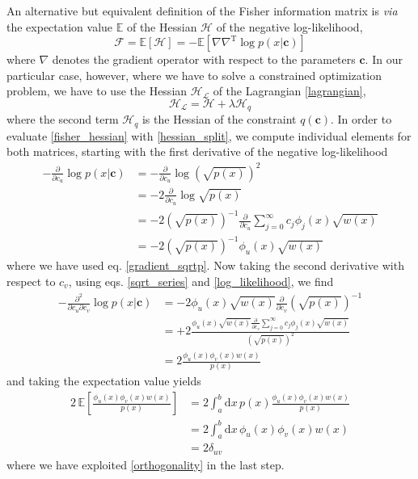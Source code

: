 \documentclass[]{report}
\begin{document}
		An alternative but equivalent definition of the Fisher information matrix is \textit{via} the expectation value $\mathbb{E}$ of the Hessian $\bm{\mathcal{H}}$ of the negative log-likelihood,
		\begin{equation}\label{fisher_hessian}
			\bm{\mathcal{F}} = \mathbb{E}\left[\bm{\mathcal{H}}\right] = -\mathbb{E}\left[\nabla\nabla^\mathrm{T}\log p(x\vert\mathbf{c})\right]
		\end{equation}
		where $\nabla$ denotes the gradient operator with respect to the parameters $\mathbf{c}$. In our particular case, however, where we have to solve a constrained optimization problem, we have to use the Hessian $\bm{\mathcal{H}}_\mathcal{L}$ of the Lagrangian \ref{lagrangian},
		\begin{equation}\label{hessian_split}
			\bm{\mathcal{H}}_\mathcal{L} = \bm{\mathcal{H}} + \lambda\bm{\mathcal{H}}_q
		\end{equation}
		where the second term $\bm{\mathcal{H}}_q$ is the Hessian of the constraint $q(\mathbf{c})$. In order to evaluate \ref{fisher_hessian} with \ref{hessian_split}, we compute individual elements for both matrices, starting with the first derivative of the negative log-likelihood
		\begin{align}\label{gradient_logp}
			-\frac{\partial}{\partial c_u}\log p(x\vert\mathbf{c}) & = -\frac{\partial}{\partial 	c_u}\log\left(\sqrt{p(x)}\right)^2 \nonumber \\
			& = -2\frac{\partial}{\partial c_u}\log\sqrt{p(x)} \\
			& = -2\left(\sqrt{p(x)}\right)^{-1}\frac{\partial}{\partial c_u}\sum_{j=0}^{\infty}c_j\phi_j(x)\sqrt{w(x)} \nonumber \\
			& = -2\left(\sqrt{p(x)}\right)^{-1}\phi_u(x)\sqrt{w(x)} \nonumber
		\end{align}
		where we have used eq. \ref{gradient_sqrtp}. Now taking the second derivative with respect to $c_v$, using eqs. \ref{sqrt_series} and \ref{log_likelihood}, we find
		\begin{align}\label{hessian_logp}
			-\frac{\partial^2}{\partial c_u\partial c_v}\log p(x\vert\mathbf{c}) & = -2\phi_u(x)\sqrt{w(x)}\frac{\partial}{\partial c_v}\left(\sqrt{p(x)}\right)^{-1} \nonumber \\
			& = +2\frac{\phi_u(x)\sqrt{w(x)}\frac{\partial}{\partial c_v}\sum_{j=0}^{\infty}c_j\phi_j(x)\sqrt{w(x)}}{\left(\sqrt{p(x)}\right)^{2}} \nonumber \\
			& = 2\frac{\phi_u(x)\phi_v(x)w(x)}{p(x)}
		\end{align}
		and taking the expectation value yields
		\begin{align}
			2\,\mathbb{E}\left[\frac{\phi_u(x)\phi_v(x)w(x)}{p(x)}\right] & = 	2\int_a^b\mathrm{d}x\,p(x)\frac{\phi_u(x)\phi_v(x)w(x)}{p(x)} \nonumber \\
			& = 2\int_a^b\mathrm{d}x\,\phi_u(x)\phi_v(x)w(x) \\
			& = 2\delta_{uv} \nonumber
		\end{align}
		where we have exploited \ref{orthogonality} in the last step.
		
\end{document}
